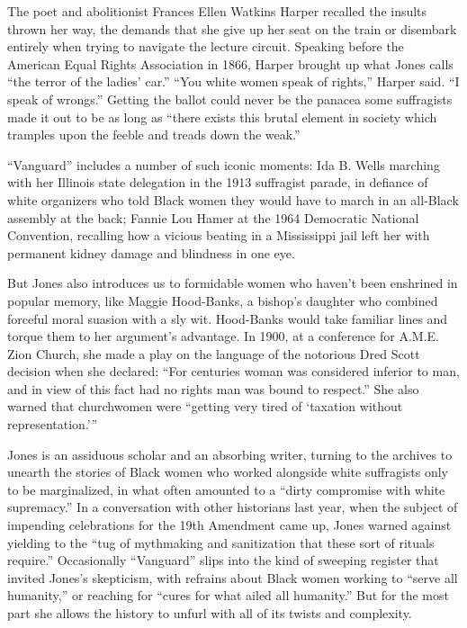 The poet and abolitionist Frances Ellen Watkins Harper recalled the
insults thrown her way, the demands that she give up her seat on the
train or disembark entirely when trying to navigate the lecture circuit.
Speaking before the American Equal Rights Association in 1866, Harper
brought up what Jones calls ``the terror of the ladies' car.'' ``You
white women speak of rights,'' Harper said. ``I speak of wrongs.''
Getting the ballot could never be the panacea some suffragists made it
out to be as long as ``there exists this brutal element in society which
tramples upon the feeble and treads down the weak.''

``Vanguard'' includes a number of such iconic moments: Ida B. Wells
marching with her Illinois state delegation in the 1913 suffragist
parade, in defiance of white organizers who told Black women they would
have to march in an all-Black assembly at the back; Fannie Lou Hamer at
the 1964 Democratic National Convention, recalling how a vicious beating
in a Mississippi jail left her with permanent kidney damage and
blindness in one eye.

But Jones also introduces us to formidable women who haven't been
enshrined in popular memory, like Maggie Hood-Banks, a bishop's daughter
who combined forceful moral suasion with a sly wit. Hood-Banks would
take familiar lines and torque them to her argument's advantage. In
1900, at a conference for A.M.E. Zion Church, she made a play on the
language of the notorious Dred Scott decision when she declared: ``For
centuries woman was considered inferior to man, and in view of this fact
had no rights man was bound to respect.'' She also warned that
churchwomen were ``getting very tired of `taxation without
representation.'''

Jones is an assiduous scholar and an absorbing writer, turning to the
archives to unearth the stories of Black women who worked alongside
white suffragists only to be marginalized, in what often amounted to a
``dirty compromise with white supremacy.'' In a conversation with other
historians last year, when the subject of impending celebrations for the
19th Amendment came up, Jones warned against yielding to the ``tug of
mythmaking and sanitization that these sort of rituals require.''
Occasionally ``Vanguard'' slips into the kind of sweeping register that
invited Jones's skepticism, with refrains about Black women working to
``serve all humanity,'' or reaching for ``cures for what ailed all
humanity.'' But for the most part she allows the history to unfurl with
all of its twists and complexity.

